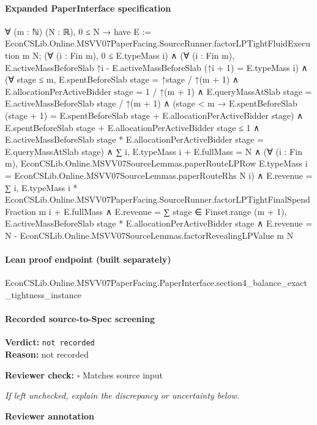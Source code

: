 \documentclass[10pt]{article}
\newcommand{\reviewerbox}{%
  \par\noindent\fbox{\parbox{0.96\linewidth}{\rule{0pt}{0.38in}}}\par
}
\newcommand{\reviewmatch}[1]{%
  \par\noindent\textbf{Reviewer check:} $\square$\; #1\par
  \noindent\emph{If left unchecked, explain the discrepancy or uncertainty below.}\par
}
\begin{document}
\paragraph{Expanded PaperInterface specification}
\begin{ReviewVerbatim}
∀ (m : ℕ) (N : ℝ),
  0 ≤ N →
    have E := EconCSLib.Online.MSVV07PaperFacing.SourceRunner.factorLPTightFluidExecution m N;
    (∀ (i : Fin m), 0 ≤ E.typeMass i) ∧
      (∀ (i : Fin m), E.activeMassBeforeSlab ↑i - E.activeMassBeforeSlab (↑i + 1) = E.typeMass i) ∧
        (∀ stage ≤ m,
            E.spentBeforeSlab stage = ↑stage / ↑(m + 1) ∧
              E.allocationPerActiveBidder stage = 1 / ↑(m + 1) ∧
                E.queryMassAtSlab stage = E.activeMassBeforeSlab stage / ↑(m + 1) ∧
                  (stage < m →
                      E.spentBeforeSlab (stage + 1) = E.spentBeforeSlab stage + E.allocationPerActiveBidder stage) ∧
                    E.spentBeforeSlab stage + E.allocationPerActiveBidder stage ≤ 1 ∧
                      E.activeMassBeforeSlab stage * E.allocationPerActiveBidder stage = E.queryMassAtSlab stage) ∧
          ∑ i, E.typeMass i + E.fullMass = N ∧
            (∀ (i : Fin m),
                EconCSLib.Online.MSVV07SourceLemmas.paperRouteLPRow E.typeMass i =
                  EconCSLib.Online.MSVV07SourceLemmas.paperRouteRhs N i) ∧
              E.revenue =
                  ∑ i,
                      E.typeMass i *
                        EconCSLib.Online.MSVV07PaperFacing.SourceRunner.factorLPTightFinalSpendFraction m i +
                    E.fullMass ∧
                E.revenue =
                    ∑ stage ∈ Finset.range (m + 1), E.activeMassBeforeSlab stage * E.allocationPerActiveBidder stage ∧
                  E.revenue = N - EconCSLib.Online.MSVV07SourceLemmas.factorRevealingLPValue m N
\end{ReviewVerbatim}

\paragraph{Lean proof endpoint (built separately)}\begin{ReviewVerbatim}
EconCSLib.Online.MSVV07PaperFacing.PaperInterface.section4_balance_exact_tightness_instance
\end{ReviewVerbatim}

\paragraph{Recorded source-to-Spec screening}
\textbf{Verdict:} \texttt{not recorded}
\\
\textbf{Reason:} not recorded
\reviewmatch{Matches source input}
\noindent\textbf{Reviewer annotation}\par
\reviewerbox
\clearpage
\hypertarget{source-claim-a55d8cca7098cedb}{}
\end{document}
